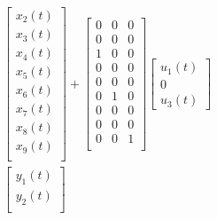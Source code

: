 \documentclass[12pt,a4paper]{article}
\begin{document}
\[\begin{aligned}
\begin{bmatrix}
                                        x_2(t) \\
                                        x_3(t) \\
                                        x_4(t) \\
                                        x_5(t) \\
                                        x_6(t) \\
                                        x_7(t) \\
                                        x_8(t) \\
                                        x_9(t) \\
                                    \end{bmatrix} + \begin{bmatrix}
                                                    0 & 0 & 0 \\
                                                    0 & 0 & 0 \\
                                                    1 & 0 & 0 \\
                                                    0 & 0 & 0 \\
                                                    0 & 0 & 0 \\
                                                    0 & 1 & 0 \\
                                                    0 & 0 & 0 \\
                                                    0 & 0 & 0 \\
                                                    0 & 0 & 1 \\
                                                \end{bmatrix} \begin{bmatrix}
                                                                u_1(t) \\
                                                                0 \\
                                                                u_3(t)
                                                            \end{bmatrix} \\
        \begin{bmatrix}
            y_1(t) \\
            y_2(t) \\

\end{bmatrix}
\end{aligned}\]
\end{document}
